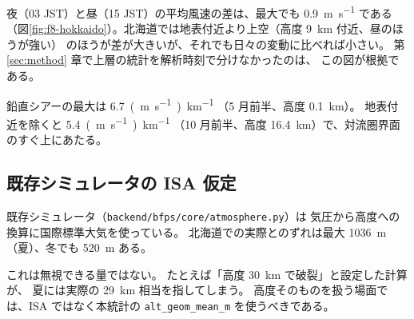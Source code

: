 


夜（03 JST）と昼（15 JST）の平均風速の差は、最大でも \SI{0.9}{\metre\per\second} である
（図\ref{fig:f8-hokkaido}）。北海道では地表付近より上空（高度 \SI{9}{\kilo\metre} 付近、昼のほうが強い）
のほうが差が大きいが、それでも日々の変動に比べれば小さい。
第 \ref{sec:method} 章で上層の統計を解析時刻で分けなかったのは、
この図が根拠である。

鉛直シアーの最大は \SI{6.7}{(\metre\per\second)\per\kilo\metre}
（5 月前半、高度 \SI{0.1}{\kilo\metre}）。
地表付近を除くと \SI{5.4}{(\metre\per\second)\per\kilo\metre}
（10 月前半、高度 \SI{16.4}{\kilo\metre}）で、対流圏界面のすぐ上にあたる。

\subsection{既存シミュレータの ISA 仮定}



既存シミュレータ（\texttt{backend/bfps/core/atmosphere.py}）は
気圧から高度への換算に国際標準大気を使っている。
北海道での実際とのずれは最大 \SI{1036}{\metre}（夏）、冬でも \SI{520}{\metre} ある。

これは無視できる量ではない。
たとえば「高度 \SI{30}{\kilo\metre} で破裂」と設定した計算が、
夏には実際の \SI{29}{\kilo\metre} 相当を指してしまう。
高度そのものを扱う場面では、ISA ではなく本統計の
\texttt{alt\_geom\_mean\_m} を使うべきである。
